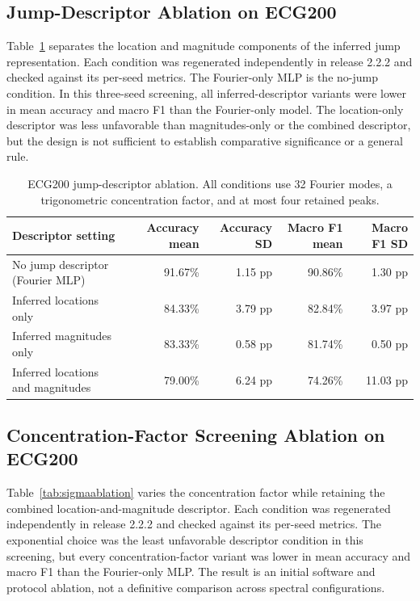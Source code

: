 \documentclass[mathematics,article,submit,moreauthors,pdftex]{mdpi}
\begin{document}
\subsection{Jump-Descriptor Ablation on ECG200}

Table~\ref{tab:jumpablation} separates the location and magnitude components of the inferred jump representation. Each condition was regenerated independently in release 2.2.2 and checked against its per-seed metrics. The Fourier-only MLP is the no-jump condition. In this three-seed screening, all inferred-descriptor variants were lower in mean accuracy and macro F1 than the Fourier-only model. The location-only descriptor was less unfavorable than magnitudes-only or the combined descriptor, but the design is not sufficient to establish comparative significance or a general rule.

\begin{table}[H]
\caption{ECG200 jump-descriptor ablation. All conditions use 32 Fourier modes, a trigonometric concentration factor, and at most four retained peaks.}
\label{tab:jumpablation}
\centering
\begin{tabular}{lrrrr}
\toprule
Descriptor setting & Accuracy mean & Accuracy SD & Macro F1 mean & Macro F1 SD \\
\midrule
No jump descriptor (Fourier MLP) & 91.67\% & 1.15 pp & 90.86\% & 1.30 pp \\
Inferred locations only & 84.33\% & 3.79 pp & 82.84\% & 3.97 pp \\
Inferred magnitudes only & 83.33\% & 0.58 pp & 81.74\% & 0.50 pp \\
Inferred locations and magnitudes & 79.00\% & 6.24 pp & 74.26\% & 11.03 pp \\
\bottomrule
\end{tabular}
\end{table}

\subsection{Concentration-Factor Screening Ablation on ECG200}

Table~\ref{tab:sigmaablation} varies the concentration factor while retaining the combined location-and-magnitude descriptor. Each condition was regenerated independently in release 2.2.2 and checked against its per-seed metrics. The exponential choice was the least unfavorable descriptor condition in this screening, but every concentration-factor variant was lower in mean accuracy and macro F1 than the Fourier-only MLP. The result is an initial software and protocol ablation, not a definitive comparison across spectral configurations.
\end{document}
